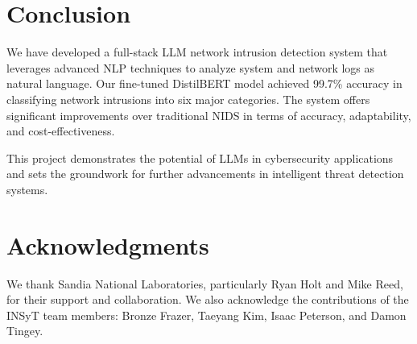 \documentclass[12pt]{article}
\begin{document}
\section{Conclusion}

We have developed a full-stack LLM network intrusion detection system that leverages advanced NLP techniques to analyze system and network logs as natural language. Our fine-tuned DistilBERT model achieved 99.7\% accuracy in classifying network intrusions into six major categories. The system offers significant improvements over traditional NIDS in terms of accuracy, adaptability, and cost-effectiveness.

This project demonstrates the potential of LLMs in cybersecurity applications and sets the groundwork for further advancements in intelligent threat detection systems.

\section*{Acknowledgments}

We thank Sandia National Laboratories, particularly Ryan Holt and Mike Reed, for their support and collaboration. We also acknowledge the contributions of the INSyT team members: Bronze Frazer, Taeyang Kim, Isaac Peterson, and Damon Tingey.
\end{document}
